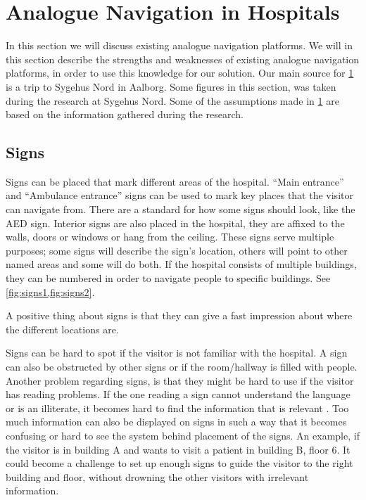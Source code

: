 \section{Analogue Navigation in Hospitals} %
\label{sec:anal_nav}
In this section we will discuss existing analogue navigation platforms. We will in this section describe the strengths and weaknesses of existing analogue navigation platforms, in order to use this knowledge for our solution. Our main source for \cref{sec:anal_nav} is a trip to Sygehus Nord in Aalborg. Some figures in this section, was taken during the research at Sygehus Nord. Some of the assumptions made in \cref{sec:anal_nav} are based on the information gathered during the research. 

\subsection{Signs} \label{sub:sign}

Signs can be placed that mark different areas of the hospital. \enquote{Main entrance} and \enquote{Ambulance entrance}\cite{signs_hospital} signs can be used to mark key places that the visitor can navigate from\cite{art_Osborne}. There are a standard for how some signs should look, like the AED sign\cite{Signs_AED}.
Interior signs are also placed in the hospital, they are affixed to the walls, doors or windows or hang from the ceiling. These signs serve multiple purposes; some signs will describe the sign's location, others will point to other named areas and some will do both. 
If the hospital consists of multiple buildings, they can be numbered in order to navigate people to specific buildings. See \cref{fig:signs1,fig:signs2}.

A positive thing about signs is that they can give a fast impression about where the different locations are.

Signs can be hard to spot if the visitor is not familiar with the hospital. A sign can also be obstructed by other signs or if the room/hallway is filled with people. Another problem regarding signs, is that they might be hard to use if the visitor has reading problems. If the one reading a sign cannot understand the language or is an illiterate, it becomes hard to find the information that is relevant \cite{signs_reading}. Too much information can also be displayed on signs in such a way that it becomes confusing or hard to see the system behind placement of the signs.
An example, if the visitor is in building A and wants to visit a patient in building B, floor 6. It could become a challenge to set up enough signs to guide the visitor to the right building and floor, without drowning the other visitors with irrelevant information.

